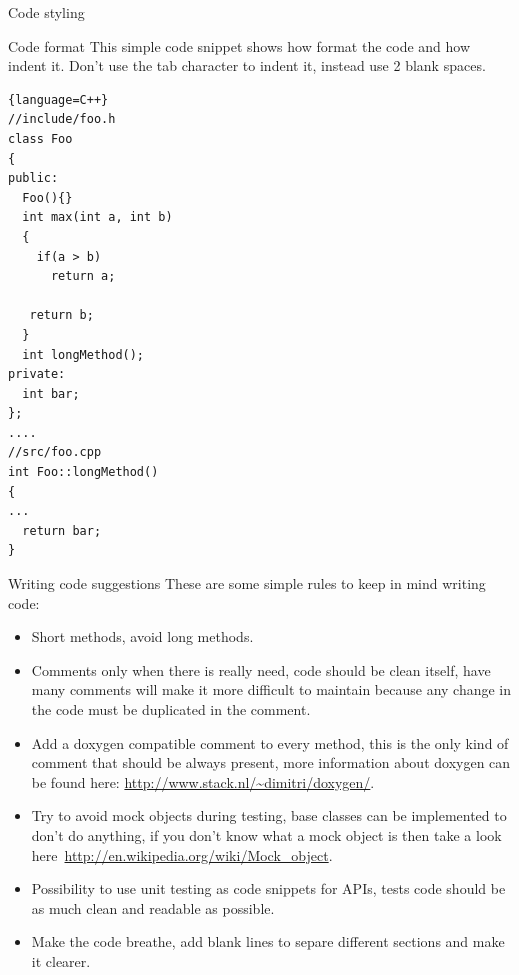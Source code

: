 \documentclass[12pt]{article}
\begin{document}
\begin{section}{Code styling}
\begin{subsection}{Code format}
This simple code snippet shows how format the code and how indent it.
Don't use the tab character to indent it, instead use 2 blank spaces. 
\begin{lstlisting}{language=C++}
//include/foo.h
class Foo
{
public:
  Foo(){}
  int max(int a, int b)
  {
    if(a > b)
      return a;

   return b;
  }
  int longMethod();
private:
  int bar;
};
....
//src/foo.cpp
int Foo::longMethod()
{
...
  return bar;
}
\end{lstlisting}
\end{subsection}

\begin{subsection}{Writing code suggestions}
These are some simple rules to keep in mind writing code:
\begin{itemize}
\item Short methods, avoid long methods.
\item Comments only when there is really need, code should be clean
  itself, have many comments will make it more difficult to maintain
  because any change in the code must be duplicated in the comment.
\item Add a doxygen compatible comment to every method, this is the
  only kind of comment that should be always present, more information
  about doxygen can be found here:
  \url{http://www.stack.nl/~dimitri/doxygen/}.
\item Try to avoid mock objects during testing, base classes can be
  implemented to don't do anything, if you don't know what a mock
  object is then take a look
  here~\url{http://en.wikipedia.org/wiki/Mock_object}.
\item Possibility to use unit testing as code snippets for APIs, tests
  code should be as much clean and readable as possible.
\item Make the code breathe, add blank lines to separe different
  sections and make it clearer.
\end{itemize}
\end{subsection}
\end{section}
\clearpage
\end{document}
